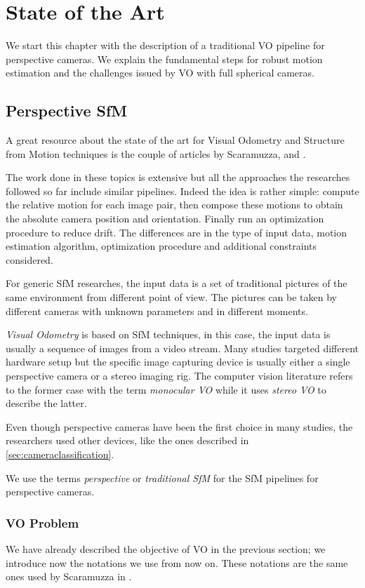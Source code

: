 \chapter{State of the Art}
We start this chapter with the description of a traditional VO pipeline for 
perspective cameras. We explain the fundamental steps for robust motion 
estimation and the challenges issued by VO with full spherical cameras.

\section{Perspective SfM}
A great resource about the state of the art for Visual Odometry and Structure 
from Motion techniques is the couple of articles by Scaramuzza,  
\cite{scaramuzzaVisualOdometryI} and \cite{scaramuzzaVisualOdometryII}.

The work done in these topics is extensive but all the approaches the 
researches followed so far include similar pipelines.
Indeed the idea is rather simple: compute the relative motion for each image
pair, then compose these motions to obtain the absolute camera position and 
orientation. Finally run an optimization procedure to reduce drift.
The differences are in the type of input data, motion estimation algorithm,
 optimization procedure and additional constraints considered.

For generic SfM researches, the input data is a set of traditional pictures of 
the same environment from different point of view. The pictures can be taken by 
different cameras with unknown parameters and in different moments.

\textit{Visual Odometry} is based on SfM techniques, 
in this case, the input data is usually a sequence 
of images from a video stream. Many studies targeted different hardware setup 
but the specific image capturing device is usually either a single perspective 
camera or a stereo imaging rig. The computer vision literature refers to the
former case with the term \textit{monocular VO} while it uses \textit{stereo VO}
to describe the latter.

Even though perspective cameras have been the first choice in many studies, 
the researchers used other devices, like the ones described in 
\ref{sec:cameraclassification}.

We use the terms \textit{perspective} or \textit{traditional SfM} for the 
SfM pipelines for perspective cameras.

\subsection{VO Problem}
We have already described the objective of VO in the previous section; we
introduce now the notations we use from now on. These notations are the same 
ones used by Scaramuzza in \cite{scaramuzzaVisualOdometryI}.

